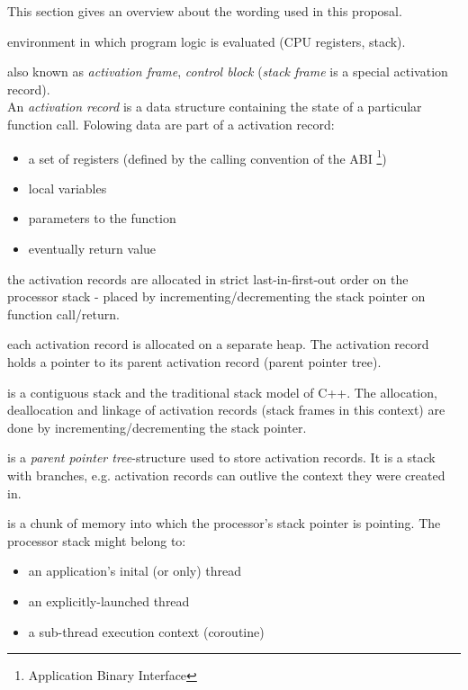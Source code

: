 This section gives an overview about the wording used in this proposal.

environment in which program logic is evaluated (CPU registers, stack).

also known as \emph{activation frame}, \emph{control block} (\emph{stack frame}
is a special activation record).\\
An \emph{activation record} is a data structure containing the state of a
particular function call. Folowing data are part of a activation record:
\begin{itemize}
    \item a set of registers (defined by the calling convention of the ABI
        \footnote{Application Binary Interface})
    \item local variables
    \item parameters to the function
    \item eventually return value
\end{itemize}

the activation records are allocated in strict last-in-first-out order on the
processor stack - placed by incrementing/decrementing the stack pointer on
function call/return.

each activation record is allocated on a separate heap. The activation record
holds a pointer to its parent activation record (parent pointer tree).

is a contiguous stack and the traditional stack model of C++. The allocation,
deallocation and linkage of activation records (stack frames in this context)
are done by incrementing/decrementing the stack pointer.

is a \emph{parent pointer tree}-structure used to store activation records. It
is a stack with branches, e.g. activation records can outlive the context they
were created in.

is a chunk of memory into which the processor's stack pointer is pointing. The
processor stack might belong to:
\begin{itemize}
    \item an application's inital (or only) thread
    \item an explicitly-launched thread
    \item a sub-thread execution context (coroutine)
\end{itemize}

